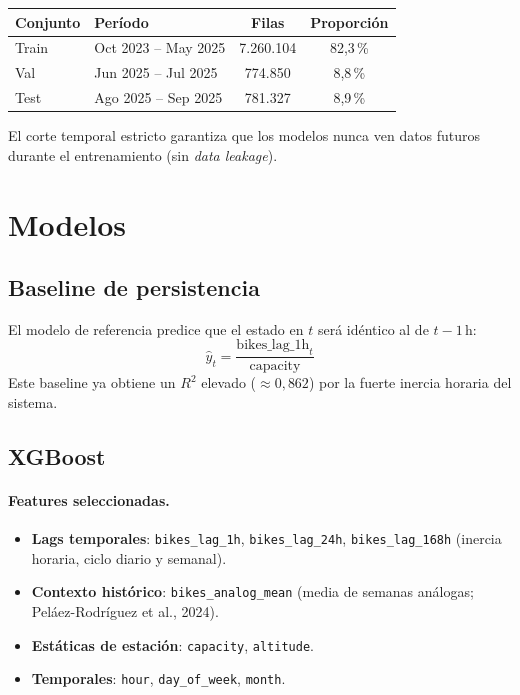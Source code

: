 \documentclass[12pt,a4paper]{article}
\begin{document}
\begin{center}
\begin{tabular}{llcc}
\toprule
\textbf{Conjunto} & \textbf{Período} & \textbf{Filas} & \textbf{Proporción} \\
\midrule
Train & Oct 2023 -- May 2025 & 7.260.104 & 82,3\,\% \\
Val   & Jun 2025 -- Jul 2025 &   774.850 &  8,8\,\% \\
Test  & Ago 2025 -- Sep 2025 &   781.327 &  8,9\,\% \\
\bottomrule
\end{tabular}
\end{center}

El corte temporal estricto garantiza que los modelos nunca ven datos futuros durante
el entrenamiento (sin \textit{data leakage}).

\section{Modelos}

\subsection{Baseline de persistencia}

El modelo de referencia predice que el estado en $t$ será idéntico al de $t-1\,\text{h}$:
\[
  \hat{y}_t = \frac{\text{bikes\_lag\_1h}_t}{\text{capacity}}
\]
Este baseline ya obtiene un $R^2$ elevado ($\approx 0{,}862$) por la fuerte inercia horaria
del sistema.

\subsection{XGBoost}

\paragraph{Features seleccionadas.}
\begin{itemize}
  \item \textbf{Lags temporales}: \texttt{bikes\_lag\_1h}, \texttt{bikes\_lag\_24h},
        \texttt{bikes\_lag\_168h} (inercia horaria, ciclo diario y semanal).
  \item \textbf{Contexto histórico}: \texttt{bikes\_analog\_mean} (media de semanas
        análogas; Peláez-Rodríguez et al., 2024).
  \item \textbf{Estáticas de estación}: \texttt{capacity}, \texttt{altitude}.
  \item \textbf{Temporales}: \texttt{hour}, \texttt{day\_of\_week}, \texttt{month}.
\end{itemize}
\end{document}
